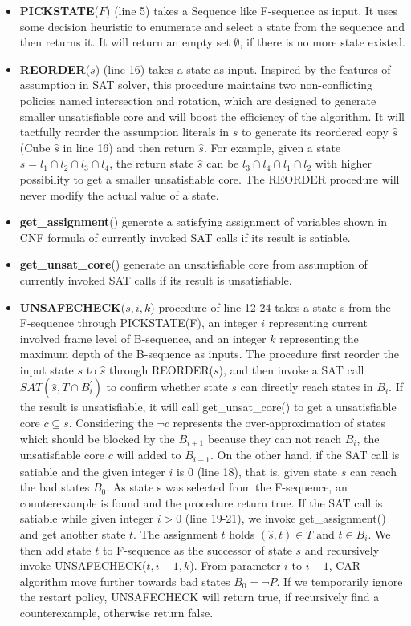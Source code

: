 \begin{itemize}
    
    \iffalse
    \item \textbf{PICKSTATE}($F$) (line 5) takes a Sequence like F-sequence as input. It uses some decision heuristic to enumerate and select a state from the sequence and then returns it. It will return an empty set $\emptyset$, if there is no more state existed.
    \item \textbf{REORDER}($s$) (line 16) takes a state as input. Inspired by the features of assumption in SAT solver, this procedure maintains two non-conflicting policies named intersection and rotation, which are designed to generate smaller unsatisfiable core and will boost the efficiency of the algorithm. It will tactfully reorder the assumption literals in $s$ to generate its reordered copy $\hat{s}$ (Cube $\hat{s}$ in line 16) and then return $\hat{s}$. For example, given a state $s=l_{1}\cap l_{2}\cap l_{3}\cap l_{4}$, the return state $\hat{s}$ can be $l_{3}\cap l_{4}\cap l_{1}\cap l_{2}$ with higher possibility to get a smaller unsatisfiable core. The REORDER procedure will never modify the actual value of a state.
    \item \textbf{get\_assignment}() generate a satisfying assignment of variables shown in CNF formula of currently invoked SAT calls if its result is satiable.
    \item \textbf{get\_unsat\_core}() generate an unsatisfiable core from assumption of currently invoked SAT calls if its result is unsatisfiable.
    \item \textbf{UNSAFECHECK}($s,i,k$) procedure of line 12-24 takes a state s from the F-sequence through PICKSTATE(F), an integer $i$ representing current involved frame level of B-sequence, and an integer $k$ representing the maximum depth of the B-sequence as inputs. The procedure first reorder the input state $s$ to $\hat{s}$ through REORDER($s$), and then invoke a SAT call $\mathit{SAT}(\hat{s},T\cap B^{'}_{i})$ to confirm whether state $s$ can directly reach states in $B_{i}$. If the result is unsatisfiable, it will call get\_unsat\_core() to get a unsatisfiable core $c \subseteq s$. Considering the $\neg c$ represents the over-approximation of states which should be blocked by the $B_{i+1}$ because they can not reach $B_{i}$, the unsatisfiable core $c$ will added to $B_{i+1}$. On the other hand, if the SAT call is satiable and the given integer $i$ is 0 (line 18), that is, given state $s$ can reach the bad states $B_{0}$. As state s was selected from the F-sequence, an counterexample is found and the procedure return true. If the SAT call is satiable while given integer $i>0$ (line 19-21), we invoke get\_assignment() and get another state $t$. The assignment $t$ holds $(\hat{s},t) \in T$ and $t\in B_{i}$. We then add state $t$ to F-sequence as the successor of state $s$ and recursively invoke UNSAFECHECK($t,i-1,k$). From parameter $i$ to $i-1$, CAR algorithm move further towards bad states $B_{0}=\neg P$. If we temporarily ignore the restart policy, UNSAFECHECK will return true, if recursively find a counterexample, otherwise return false.

\end{itemize}
